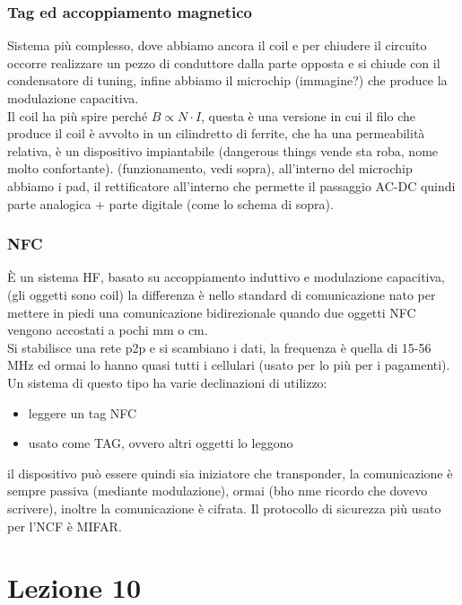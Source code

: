 \documentclass[oneside, 12pt]{extbook}
\begin{document}
\subsection{Tag ed accoppiamento magnetico}
Sistema più complesso, dove abbiamo ancora il coil e per chiudere il circuito occorre realizzare un pezzo di conduttore dalla parte opposta e si chiude con il condensatore di tuning, infine abbiamo il microchip (immagine?) che produce la modulazione capacitiva.\\Il coil ha più spire perché $B \propto N \cdot I$, questa è una versione in cui il filo che produce il coil è avvolto in un cilindretto di ferrite, che ha una permeabilità relativa, è un dispositivo impiantabile (dangerous things vende sta roba, nome molto confortante). (funzionamento, vedi sopra), all'interno del microchip abbiamo i pad, il rettificatore all'interno che permette il passaggio AC-DC quindi parte analogica + parte digitale (come lo schema di sopra).
\subsection{NFC}
È un sistema HF, basato su accoppiamento induttivo e modulazione capacitiva, (gli oggetti sono coil) la differenza è nello standard di comunicazione nato per mettere in piedi una comunicazione bidirezionale quando due oggetti NFC vengono accostati a pochi mm o cm.\\Si stabilisce una rete p2p e si scambiano i dati, la frequenza è quella di 15-56 MHz ed ormai lo hanno quasi tutti i cellulari (usato per lo più per i pagamenti).\\Un sistema di questo tipo ha varie declinazioni di utilizzo:
\begin{itemize}
	\item leggere un tag NFC
	\item usato come TAG, ovvero altri oggetti lo leggono
\end{itemize} 
il dispositivo può essere quindi sia iniziatore che transponder, la comunicazione è sempre passiva (mediante modulazione), ormai (bho nme ricordo che dovevo scrivere), inoltre la comunicazione è cifrata.
Il protocollo di sicurezza più usato per l'NCF è MIFAR.


\chapter{Lezione 10}
\end{document}

